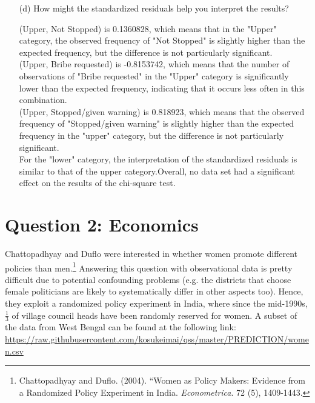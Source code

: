 \documentclass[12pt,letterpaper]{article}
\begin{document}
\begin{enumerate}
	
	\vspace{7cm}
	\item [(d)] How might the standardized residuals help you interpret the results? 
	 
	 
	(Upper, Not Stopped) is 0.1360828, which means that in the "Upper" category, the observed frequency of "Not Stopped" is slightly higher than the expected frequency, but the difference is not particularly significant.\\
	(Upper, Bribe requested) is -0.8153742, which means that the number of observations of "Bribe requested" in the "Upper" category is significantly lower than the expected frequency, indicating that it occurs less often in this combination.\\
	(Upper, Stopped/given warning) is 0.818923, which means that the observed frequency of "Stopped/given warning" is slightly higher than the expected frequency in the "upper" category, but the difference is not particularly significant.\\
	
	For the "lower" category, the interpretation of the standardized residuals is similar to that of the upper category.Overall, no data set had a significant effect on the results of the chi-square test.
	
\end{enumerate}
\newpage

\section*{Question 2: Economics}
Chattopadhyay and Duflo were interested in whether women promote different policies than men.\footnote{Chattopadhyay and Duflo. (2004). ``Women as Policy Makers: Evidence from a Randomized Policy Experiment in India. \textit{Econometrica}. 72 (5), 1409-1443.} Answering this question with observational data is pretty difficult due to potential confounding problems (e.g. the districts that choose female politicians are likely to systematically differ in other aspects too). Hence, they exploit a randomized policy experiment in India, where since the mid-1990s, $\frac{1}{3}$ of village council heads have been randomly reserved for women. A subset of the data from West Bengal can be found at the following link: \url{https://raw.githubusercontent.com/kosukeimai/qss/master/PREDICTION/women.csv}\\
\end{document}
